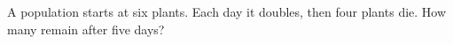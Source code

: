 A population starts at six plants. Each day it doubles, then four plants die. How many remain after five days?
